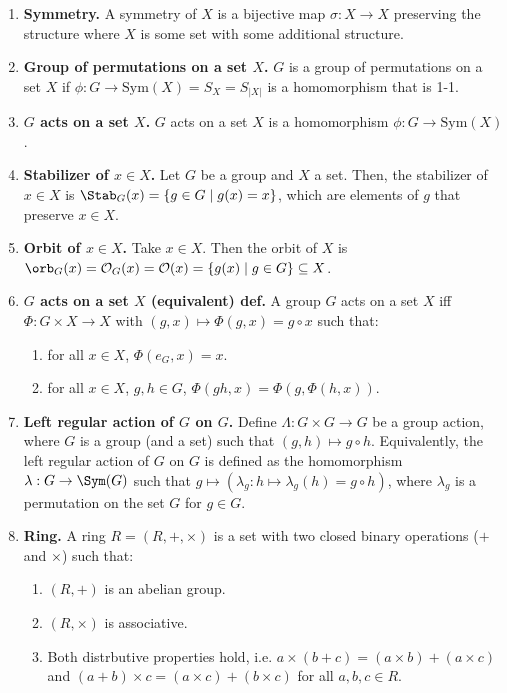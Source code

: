 \begin{enumerate}
	\item \textbf{Symmetry. } A symmetry of $X$ is a bijective map $\sigma: X \to X$ preserving the structure where $X$ is some set with some additional structure. 
	\item \textbf{Group of permutations on a set $X$. } $G$ is a group of permutations on a set $X$ if $\phi: G \to \textrm{Sym}(X)=S_X=S_{|X|}$ is a homomorphism that is 1-1. 
	\item \textbf{$G$ acts on a set $X$. } $G$ acts on a set $X$ is a homomorphism $\phi: G \to \textrm{Sym}(X)$. 
	\item \textbf{Stabilizer of $x \in X$. } Let $G$ be a group and $X$ a set. Then, the stabilizer of $x \in X$ is $\Stab_G(x) = \{g \in G \mid g(x)=x\}$, which are elements of $g$ that preserve $x \in X$. 
	\item \textbf{Orbit of $x \in X$. } Take $x \in X$. Then the orbit of $X$ is $\orb_G(x) = \mathcal{O}_G(x) = \mathcal{O}(x) = \{g(x) \mid g \in G\} \subseteq X$. 
	\item \textbf{$G$ acts on a set $X$ (equivalent) def. } A group $G$ acts on a set $X$ iff $\Phi: G \times X \to X$ with $(g,x) \mapsto \Phi(g,x) = g \circ x$ such that: 
	\begin{enumerate}
		\item for all $x \in X$, $\Phi(e_G,x) = x$. 
		\item for all $x \in X$, $g,h \in G$, $\Phi(gh,x) = \Phi(g,\Phi(h,x))$. 
	\end{enumerate}
	\item \textbf{Left regular action of $G$ on $G$. } Define $\Lambda: G \times G \to G$ be a group action, where $G$ is a group (and a set) such that $(g,h) \mapsto g \circ h$. Equivalently, the left regular action of $G$ on $G$ is defined as the homomorphism $\lambda: G \to \Sym(G)$ such that $g \mapsto (\lambda_g: h \mapsto \lambda_g(h) = g \circ h)$, where $\lambda_g$ is a permutation on the set $G$ for $g \in G$. 
	\item \textbf{Ring. } A ring $R = (R,+,\times)$ is a set with two closed binary operations ($+$ and $\times$) such that: 
	\begin{enumerate}
		\item $(R,+)$ is an abelian group. 
		\item $(R,\times)$ is associative. 
		\item Both distrbutive properties hold, i.e. $a \times (b+c) = (a \times b) + (a \times c)$ and $(a+b) \times c = (a \times c) + (b \times c)$ for all $a,b,c \in R$. 
	\end{enumerate}

\end{enumerate}

